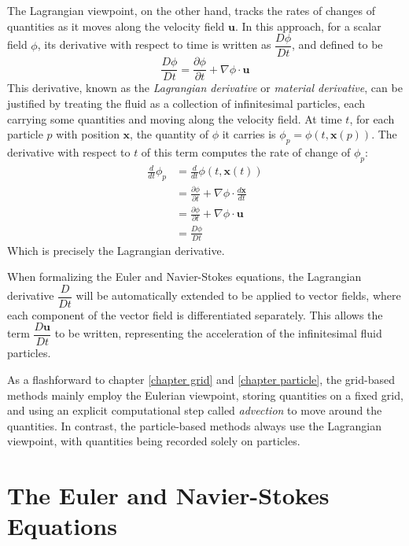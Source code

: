 The Lagrangian viewpoint, on the other hand, tracks the rates of changes of quantities as it moves along the velocity field $\textbf{u}$. In this approach, for a scalar field $\phi$, its derivative with respect to time is written as $\dfrac{D\phi}{Dt}$, and defined to be
$$
\frac{D\phi}{Dt} = \frac{\partial\phi}{\partial t} + \nabla \phi \cdot \textbf{u}
$$ 
This derivative, known as the \textit{Lagrangian derivative} or \textit{material derivative}, can be justified by treating the fluid as a collection of infinitesimal particles, each carrying some quantities and moving along the velocity field. At time $t$, for each particle $p$ with position $\textbf{x}$, the quantity of $\phi$ it carries is $\phi_p = \phi(t,\textbf{x}(p))$. The derivative with respect to $t$ of this term computes the rate of change of $\phi _p$:
$$
\begin{aligned}
    \frac{d}{dt} \phi_p
        &= \frac{d}{dt} \phi(t,\textbf{x}(t)) \\
        &= \frac{\partial \phi}{\partial t} + \nabla \phi \cdot \frac{d\textbf{x}}{dt} \\ 
        &= \frac{\partial \phi}{\partial t} + \nabla \phi \cdot \textbf{u} \\
        &=\frac{D\phi}{Dt}
\end{aligned}
$$
Which is precisely the Lagrangian derivative.

When formalizing the Euler and Navier-Stokes equations, the Lagrangian derivative $\dfrac{D}{Dt}$ will be automatically extended to be applied to vector fields, where each component of the vector field is differentiated separately. This allows the term $\dfrac{D\textbf{u}}{Dt}$ to be written, representing the acceleration of the infinitesimal fluid particles. 

As a flashforward to chapter \ref{chapter grid} and \ref{chapter particle}, the grid-based methods mainly employ the Eulerian viewpoint, storing quantities on a fixed grid, and using an explicit computational step called \textit{advection} to move around the quantities. In contrast, the particle-based methods always use the Lagrangian viewpoint, with quantities being recorded solely on particles.










\section{The Euler and Navier-Stokes Equations}
\label{Euler N-S Eqns}

